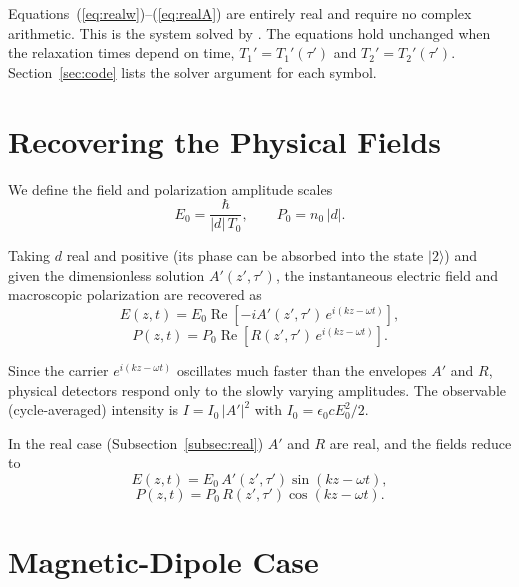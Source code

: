 \documentclass[12pt,a4paper]{article}
\newcommand{\T}{T_0}
\begin{document}
\begin{notebox}
  Equations~(\ref{eq:realw})--(\ref{eq:realA}) are entirely real and
  require no complex arithmetic. This is the system solved by
  . The equations hold unchanged when
  the relaxation times depend on time, $T_1' = T_1'(\tau')$ and
  $T_2' = T_2'(\tau')$. Section~\ref{sec:code} lists the solver argument
  for each symbol.
\end{notebox}
\section{Recovering the Physical Fields}

We define the field and polarization amplitude scales
\begin{equation}
  E_0 = \frac{\hbar}{|d|\,\T}, \qquad P_0 = n_0\,|d|.
\end{equation}

Taking $d$ real and positive (its phase can be absorbed into the state
$|2\rangle$) and given the dimensionless solution $A'(z',\tau')$, the instantaneous
electric field and macroscopic polarization are recovered as
\begin{equation}
  E(z,t) = E_0\operatorname{Re}\!\left[-iA'(z',\tau')\,e^{i(kz-\omega t)}\right],
\end{equation}
\begin{equation}
  P(z,t) = P_0\operatorname{Re}\!\left[R(z',\tau')\,e^{i(kz-\omega t)}\right].
\end{equation}

Since the carrier $e^{i(kz-\omega t)}$ oscillates much faster than the
envelopes $A'$ and $R$, physical detectors respond only to the slowly
varying amplitudes. The observable (cycle-averaged) intensity is
$I = I_0\,|A'|^2$ with $I_0 = \epsilon_0 c E_0^2/2$.

In the real case (Subsection~\ref{subsec:real}) $A'$ and $R$ are real, and the fields reduce to
\begin{equation}
  E(z,t) = E_0\,A'(z',\tau')\sin(kz-\omega t),
\end{equation}
\begin{equation}
  P(z,t) = P_0\,R(z',\tau')\cos(kz-\omega t).
\end{equation}

\section{Magnetic-Dipole Case}
\label{sec:magnetic}
\end{document}
